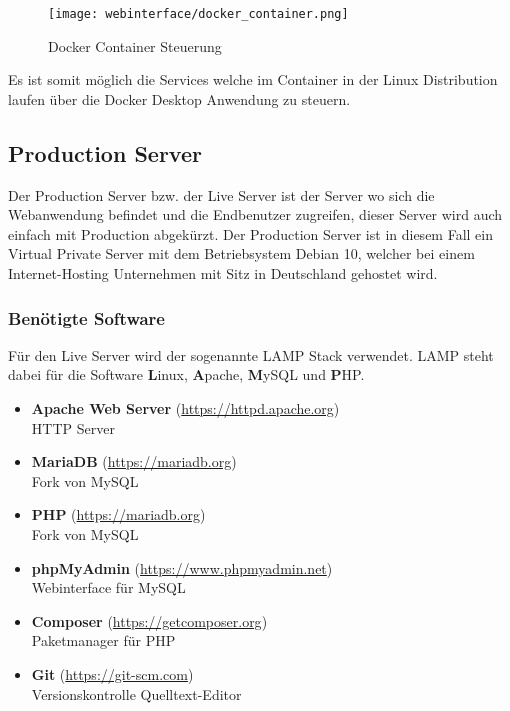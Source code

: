 \begin{figure}[H]
  \centering
  \texttt{[image: webinterface/docker\_container.png]}
  \caption{Docker Container Steuerung}
\end{figure}

Es ist somit möglich die Services welche im Container in der Linux Distribution
laufen über die Docker Desktop Anwendung zu steuern.

\subsection{Production Server}
Der Production Server bzw. der Live Server ist der Server wo sich die Webanwendung
befindet und die Endbenutzer zugreifen, dieser Server wird auch einfach mit
Production abgekürzt. Der Production Server ist in diesem Fall ein Virtual
Private Server mit dem Betriebsystem Debian 10, welcher bei einem
Internet-Hosting Unternehmen mit Sitz in Deutschland gehostet wird.

\subsubsection{Benötigte Software}

Für den Live Server wird der sogenannte \glqq LAMP\grqq{} Stack verwendet. LAMP steht dabei
für die Software \textbf{L}inux, \textbf{A}pache, \textbf{M}ySQL und \textbf{P}HP.

\begin{itemize}
  \item \textbf{Apache Web Server} (\url{https://httpd.apache.org}) \\ HTTP Server
  \item \textbf{MariaDB} (\url{https://mariadb.org}) \\ Fork von MySQL
  \item \textbf{PHP} (\url{https://mariadb.org}) \\ Fork von MySQL
  \item \textbf{phpMyAdmin} (\url{https://www.phpmyadmin.net}) \\ Webinterface
  für MySQL
  \item \textbf{Composer} (\url{https://getcomposer.org}) \\ Paketmanager für PHP
  \item \textbf{Git} (\url{https://git-scm.com}) \\ Versionskontrolle
  Quelltext-Editor
\end{itemize}

